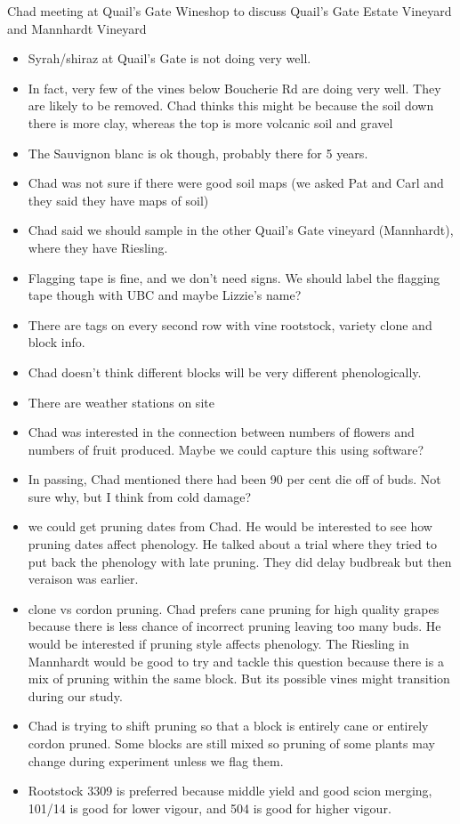 \documentclass[11pt,letter]{article}
\newenvironment{smitemize}{
\begin{itemize}
  \setlength{\itemsep}{0pt}
  \setlength{\parskip}{0.8pt}
  \setlength{\parsep}{0pt}}
{\end{itemize}
}
\begin{document}
Chad meeting at Quail's Gate Wineshop to discuss Quail's Gate Estate Vineyard and Mannhardt Vineyard
\begin{smitemize}
\item Syrah/shiraz at Quail's Gate is not doing very well. 
\item In fact, very few of the vines below Boucherie Rd are doing very well. They are likely to be removed. Chad thinks this might be because the soil down there is more clay, whereas the top is more volcanic soil and gravel 
\item The Sauvignon blanc is ok though, probably there for 5 years.
\item Chad was not sure if there were good soil maps (we asked Pat and Carl and they said they have maps of soil)
\item Chad said we should sample in the other Quail's Gate vineyard (Mannhardt), where they have Riesling. 
\item Flagging tape is fine, and we don't need signs. We should label the flagging tape though with UBC and maybe Lizzie's name?
\item There are tags on every second row with vine rootstock, variety clone and block info. 
\item Chad doesn't think different blocks will be very different phenologically. 
\item There are weather stations on site
\item Chad was interested in the connection between numbers of flowers and numbers of fruit produced. Maybe we could capture this using software?
\item In passing, Chad mentioned there had been 90 per cent die off of buds. Not sure why, but I think from cold damage?
\item we could get pruning dates from Chad. He would be interested to see how pruning dates affect phenology. He talked about a trial where they tried to put back the phenology with late pruning. They did delay budbreak but then veraison was earlier. 
\item clone vs cordon pruning. Chad prefers cane pruning for high quality grapes because there is less chance of incorrect pruning leaving too many buds. He would be interested if pruning style affects phenology. The Riesling in Mannhardt would be good to try and tackle this question because there is a mix of pruning within the same block. But its possible vines might transition during our study.
\item Chad is trying to shift pruning so that a block is entirely cane or entirely cordon pruned. Some blocks are still mixed so pruning of some plants may change during experiment unless we flag them.
\item Rootstock 3309 is preferred because middle yield and good scion merging, 101/14 is good for lower vigour, and 504 is good for higher vigour. 
\end{smitemize}
\end{document}
